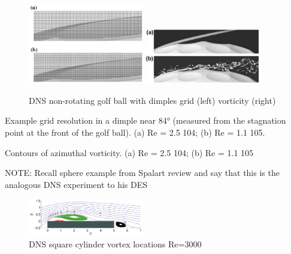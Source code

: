 \documentclass[journal]{new-aiaa}
\begin{document}
\begin{figure}[H]
\begin{center}
\includegraphics[width=0.45\textwidth]{Images/logan/smith2010numerical_golfballgrid.pdf}
\includegraphics[width=0.45\textwidth]{Images/logan/smith2010numerical_golfballvorticity.pdf}
\caption{ DNS non-rotating golf ball with dimples grid (left) vorticity (right) \cite{smith2010numerical} }
\label{fig:dnsgolfball}
\end{center}
\end{figure}


Example grid resolution in a dimple near 84° (measured from the stagnation point at the front of the golf ball). (a) Re = 2.5   104; (b) Re = 1.1   105.

Contours of azimuthal vorticity. (a) Re = 2.5   104; (b) Re = 1.1   105

NOTE: Recall sphere example from Spalart review and say that this is the analogous DNS experiment to his DES


\begin{figure}[H]
\begin{center}
\includegraphics[width=0.45\textwidth]{Images/logan/cimarelli2018direct_vortices.pdf}
\caption{ DNS square cylinder vortex locations Re=3000 \cite{cimarelli2018direct} }
\label{fig:dnsRectCylVortices}
\end{center}
\end{figure}
\end{document}
